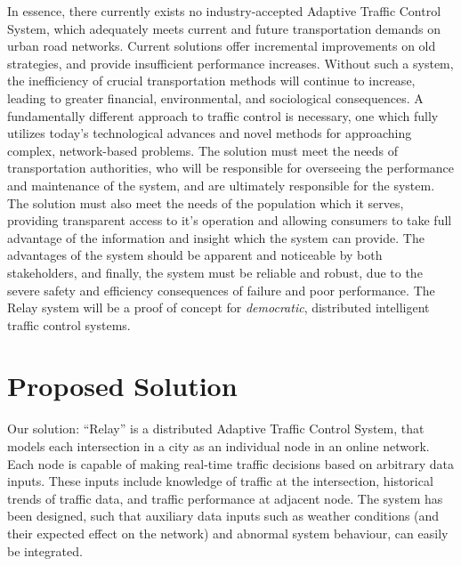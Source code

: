 \documentclass{report}
\begin{document}
In essence, there currently exists no industry-accepted Adaptive Traffic Control System, which adequately meets current and future transportation demands on urban road networks.
Current solutions offer incremental improvements on old strategies, and provide insufficient performance increases.
Without such a system, the inefficiency of crucial transportation methods will continue to increase, leading to greater financial, environmental, and sociological consequences.
A fundamentally different approach to traffic control is necessary, one which fully utilizes today's technological advances and novel methods for approaching complex, network-based problems.
The solution must meet the needs of transportation authorities, who will be responsible for overseeing the performance and maintenance of the system, and are ultimately responsible for the system.
The solution must also meet the needs of the population which it serves, providing transparent access to it's operation and allowing consumers to take full advantage of the information and insight which the system can provide.
The advantages of the system should be apparent and noticeable by both stakeholders, and finally, the system must be reliable and robust, due to the severe safety and efficiency consequences of failure and poor performance. The Relay system will be a proof of concept for \emph{democratic}, distributed intelligent traffic control systems.

\section{Proposed Solution}
Our solution: ``Relay'' is a distributed Adaptive Traffic Control System, that models each intersection in a city as an individual node in an online network.
Each node is capable of making real-time traffic decisions based on arbitrary data inputs.
These inputs include knowledge of traffic at the intersection, historical trends of traffic data, and traffic performance at adjacent node. The system has been designed, such that auxiliary data inputs such as weather conditions (and their expected effect on the network) and abnormal system behaviour, can easily be integrated.
\end{document}
